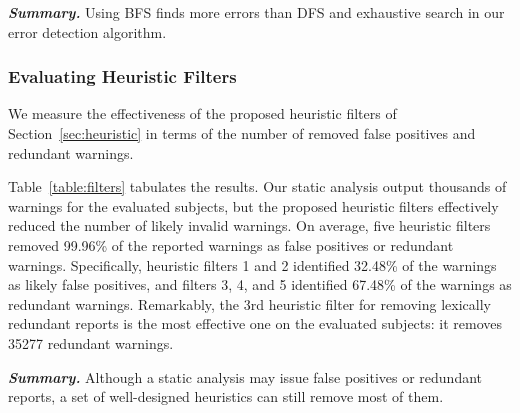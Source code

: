 \vspace{1mm}

\noindent \textbf{\textit{Summary.}} Using BFS finds more errors than DFS and
exhaustive search in our error detection algorithm. 


\subsubsection{Evaluating Heuristic Filters}
\label{sec:filters}

We measure the effectiveness of the proposed heuristic filters of
Section~\ref{sec:heuristic} in terms of the number of removed false positives and
redundant warnings.

Table~\ref{table:filters} tabulates the results.
Our static analysis output thousands of warnings for the evaluated
subjects, but the proposed heuristic filters effectively reduced
the number of likely invalid warnings. On average, five heuristic
filters removed 99.96\% of the reported warnings as false positives
or redundant warnings. Specifically, heuristic filters 1 and 2 identified
32.48\% of the warnings as likely false positives, and filters 3, 4,
and 5 identified 67.48\% of the warnings as redundant warnings.
Remarkably, the 3rd heuristic filter for removing lexically redundant
reports is the most effective one on the evaluated subjects: it removes 35277 redundant warnings.


\vspace{1mm}

\noindent \textbf{\textit{Summary.}} Although a static analysis may
issue false positives or redundant reports, a set of well-designed
heuristics can still remove most of them.

